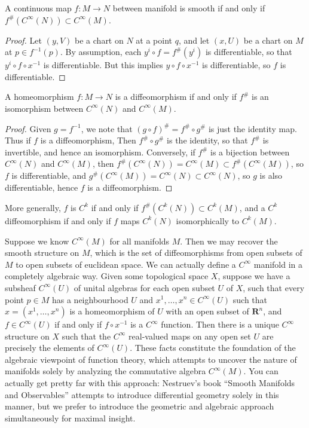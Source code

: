 \begin{lemma}
    A continuous map $f:M \to N$ between manifold is smooth if and only if $f^\#(C^\infty(N)) \subset C^\infty(M)$.
\end{lemma}
\begin{proof}
    Let $(y,V)$ be a chart on $N$ at a point $q$, and let $(x,U)$ be a chart on $M$ at $p \in f^{-1}(p)$. By assumption, each $y^i \circ f = f^\#(y^i)$ is differentiable, so that $y^i \circ f \circ x^{-1}$ is differentiable. But this implies $y \circ f \circ x^{-1}$ is differentiable, so $f$ is differentiable.
\end{proof}

\begin{theorem}
    A homeomorphism $f:M \to N$ is a diffeomorphism if and only if $f^\#$ is an isomorphism between $C^\infty(N)$ and $C^\infty(M)$.
\end{theorem}
\begin{proof}
    Given $g = f^{-1}$, we note that $(g \circ f)^\# = f^\# \circ g^\#$ is just the identity map. Thus if $f$ is a diffeomorphism, Then $f^\# \circ g^\#$ is the identity, so that $f^\#$ is invertible, and hence an isomorphism. Conversely, if $f^\#$ is a bijection between $C^\infty(N)$ and $C^\infty(M)$, then $f^\#(C^\infty(N)) = C^\infty(M) \subset f^\#(C^\infty(M))$, so $f$ is differentiable, and $g^\#(C^\infty(M)) = C^\infty(N) \subset C^\infty(N)$, so $g$ is also differentiable, hence $f$ is a diffeomorphism.
\end{proof}

\begin{remark}
    More generally, $f$ is $C^k$ if and only if $f^\#(C^k(N)) \subset C^k(M)$, and a $C^k$ diffeomorphism if and only if $f$ maps $C^k(N)$ isomorphically to $C^k(M)$.
\end{remark}

Suppose we know $C^\infty(M)$ for all manifolds $M$. Then we may recover the smooth structure on $M$, which is the set of diffeomorphisms from open subsets of $M$ to open subsets of euclidean space. We can actually define a $C^\infty$ manifold in a completely algebraic way. Given some topological space $X$, suppose we have a subsheaf $C^\infty(U)$ of unital algebras for each open subset $U$ of $X$, such that every point $p \in M$ has a neighbourhood $U$ and $x^1, \dots, x^n \in C^\infty(U)$ such that $x = (x^1, \dots, x^n)$ is a homeomorphism of $U$ with an open subset of $\mathbf{R}^n$, and $f \in C^\infty(U)$ if and only if $f \circ x^{-1}$ is a $C^\infty$ function. Then there is a unique $C^\infty$ structure on $X$ such that the $C^\infty$ real-valued maps on any open set $U$ are precisely the elements of $C^\infty(U)$. These facts constitute the foundation of the algebraic viewpoint of function theory, which attempts to uncover the nature of manifolds solely by analyzing the commutative algebra $C^\infty(M)$. You can actually get pretty far with this approach: Nestruev's book ``Smooth Manifolds and Observables'' attempts to introduce differential geometry solely in this manner, but we prefer to introduce the geometric and algebraic approach simultaneously for maximal insight.


